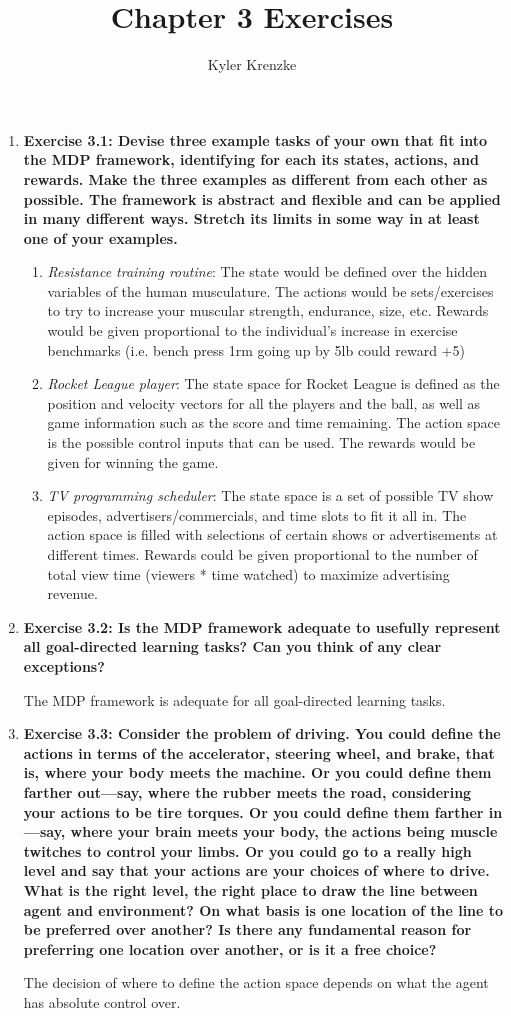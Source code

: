 \documentclass[11pt]{article}
\title{Chapter 3 Exercises}
\author{Kyler Krenzke}
\date{}
\begin{document}
	\maketitle
	
	\begin{enumerate}
	
		\item \textbf{Exercise 3.1: Devise three example tasks of your own that fit into the MDP framework, identifying for each its states, actions, and rewards. Make the three
		examples as different from each other as possible. The framework is abstract and flexible and can be applied in many different ways. Stretch its limits in some way in at
		least one of your examples.}
		\begin{enumerate}
			\item \textit{Resistance training routine}: The state would be defined over the hidden variables of the human musculature. The actions would be sets/exercises to try
			to increase your muscular strength, endurance, size, etc. Rewards would be given proportional to the individual's increase in exercise benchmarks (i.e. bench press 1rm
			going up by 5lb could reward +5)
			\item \textit{Rocket League player}: The state space for Rocket League is defined as the position and velocity vectors for all the players and the ball, as well as
			game information such as the score and time remaining. The action space is the possible control inputs that can be used. The rewards would be given for winning the
			game.
			\item \textit{TV programming scheduler}: The state space is a set of possible TV show episodes, advertisers/commercials, and time slots to fit it all in. The action
			space is filled with selections of certain shows or advertisements at different times. Rewards could be given proportional to the number of total view time (viewers *
			time watched) to maximize advertising revenue.
		\end{enumerate}
		
		\item \textbf{Exercise 3.2: Is the MDP framework adequate to usefully represent all goal-directed learning tasks? Can you think of any clear exceptions?}
		
		The MDP framework is adequate for all goal-directed learning tasks.
		
		\item \textbf{Exercise 3.3: Consider the problem of driving. You could define the actions in terms of the accelerator, steering wheel, and brake, that is, where your body
		meets the machine. Or you could define them farther out—say, where the rubber meets the road, considering your actions to be tire torques. Or you could define them farther
		in—say, where your brain meets your body, the actions being muscle twitches to control your limbs. Or you could go to a really high level and say that your actions are
		your choices of where to drive. What is the right level, the right place to draw the line between agent and environment? On what basis is one location of the line to be
		preferred over another? Is there any fundamental reason for preferring one location over another, or is it a free choice?}
		
		The decision of where to define the action space depends on what the agent has absolute control over. 
	
	\end{enumerate}
\end{document}

